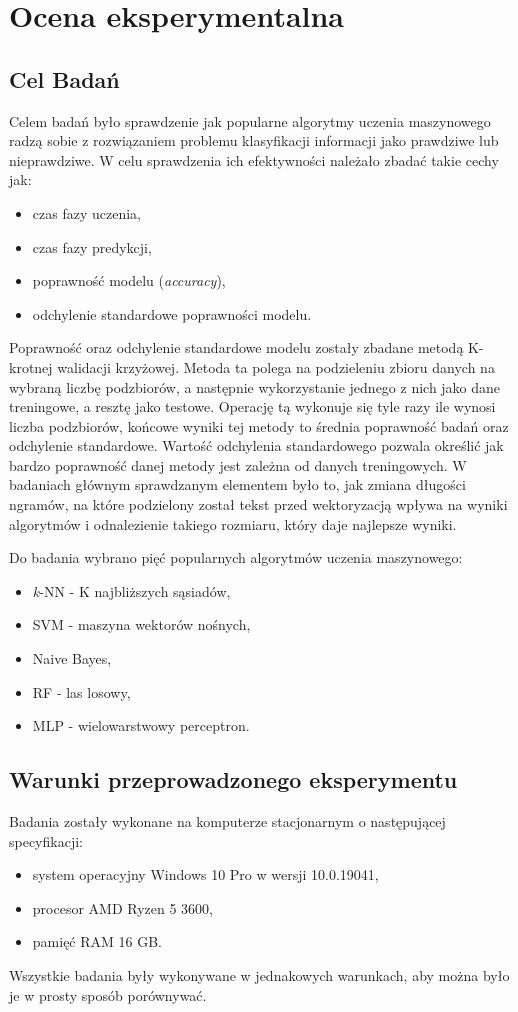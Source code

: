 \chapter{Ocena eksperymentalna}
\section{Cel Badań}
Celem badań było sprawdzenie jak popularne algorytmy uczenia maszynowego radzą sobie z rozwiązaniem problemu 
klasyfikacji informacji jako prawdziwe lub nieprawdziwe. W celu sprawdzenia ich efektywności należało zbadać
takie cechy jak:
\begin{itemize}
    \item czas fazy uczenia,
    \item czas fazy predykcji,
    \item poprawność modelu (\textit{accuracy}),
    \item odchylenie standardowe poprawności modelu.
\end{itemize}
Poprawność oraz odchylenie standardowe modelu zostały zbadane metodą K-krotnej walidacji krzyżowej. 
Metoda ta polega na podzieleniu zbioru danych na wybraną liczbę podzbiorów, a następnie wykorzystanie jednego
z nich jako dane treningowe, a resztę jako testowe. Operację tą wykonuje się tyle razy ile wynosi liczba podzbiorów,
końcowe wyniki tej metody to średnia poprawność badań oraz odchylenie standardowe. Wartość odchylenia standardowego
pozwala określić jak bardzo poprawność danej metody jest zależna od danych treningowych. 
W badaniach głównym sprawdzanym elementem było to, jak zmiana długości ngramów, na które podzielony
został tekst przed wektoryzacją wpływa na wyniki algorytmów i odnalezienie takiego rozmiaru, który
daje najlepsze wyniki. 

Do badania wybrano pięć popularnych algorytmów uczenia maszynowego: 
\begin{itemize}
    \item \textit{k}-NN - K najbliższych sąsiadów,
    \item SVM - maszyna wektorów nośnych,
    \item Naive Bayes,
    \item RF - las losowy,
    \item MLP - wielowarstwowy perceptron.
\end{itemize} 
\section{Warunki przeprowadzonego eksperymentu}
Badania zostały wykonane na komputerze stacjonarnym o następującej specyfikacji:
\begin{itemize}
    \item system operacyjny Windows 10 Pro w wersji 10.0.19041,
    \item procesor AMD Ryzen 5 3600,
    \item pamięć RAM 16 GB.
\end{itemize}
Wszystkie badania były wykonywane w jednakowych warunkach, aby można było 
je w prosty sposób porównywać. 

